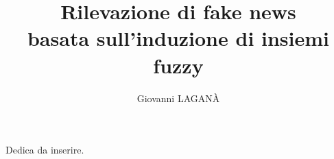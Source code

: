\documentclass[12pt]{report}
\theoremstyle{definition}
\begin{document}
\title{Rilevazione di fake news \\
basata sull'induzione di insiemi fuzzy}
\author{Giovanni LAGANÀ}
%
%
%
\beforepreface
        {\hfill \Large {\sl \begin{flushright} Dedica da inserire.         
\end{flushright}         }}
%
%
%
%
\afterpreface

%
%
\end{document}
